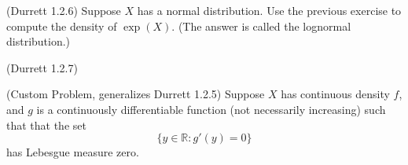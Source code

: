 \documentclass[12pt]{gradescopeexam}
\newcommand\R{\mathbb{R}}
\begin{document}
\begin{questions}
\begin{question}
  \end{question}

  \begin{question}
    (Durrett 1.2.6) Suppose $X$ has a normal distribution. Use the
    previous exercise to compute the density of $\exp(X)$. (The answer
    is called the lognormal distribution.)
    \begin{prooforbox}[7.5in]

    \end{prooforbox}
  \end{question}
  \begin{question}
    (Durrett 1.2.7)
  \end{question}

  \begin{question} (Custom Problem, generalizes Durrett 1.2.5) Suppose
    $X$ has continuous density $f$, and $g$ is a continuously
    differentiable function (not necessarily increasing) such that
    that the set $$\{y\in\R: g'(y) = 0\}$$ has Lebesgue measure
    zero.


\end{question}
\end{questions}
\end{document}
